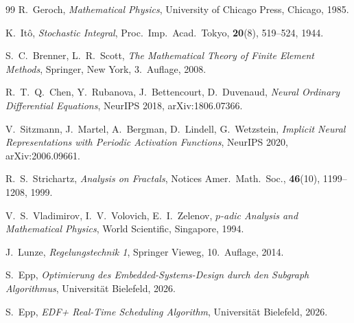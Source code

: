﻿\documentclass[a4paper,12pt]{article}
\theoremstyle{definition}
\begin{document}
\begin{thebibliography}{99}
R.~Geroch,
\textit{Mathematical Physics},
University of Chicago Press, Chicago, 1985.

K.~It\^o,
\textit{Stochastic Integral},
Proc.\ Imp.\ Acad.\ Tokyo, \textbf{20}(8), 519--524, 1944.

S.~C.\ Brenner, L.~R.\ Scott,
\textit{The Mathematical Theory of Finite Element Methods},
Springer, New York, 3.\ Auflage, 2008.

R.~T.~Q.\ Chen, Y.~Rubanova, J.~Bettencourt, D.~Duvenaud,
\textit{Neural Ordinary Differential Equations},
NeurIPS 2018, arXiv:1806.07366.

V.~Sitzmann, J.~Martel, A.~Bergman, D.~Lindell, G.~Wetzstein,
\textit{Implicit Neural Representations with Periodic Activation Functions},
NeurIPS 2020, arXiv:2006.09661.

R.~S.\ Strichartz,
\textit{Analysis on Fractals},
Notices Amer.\ Math.\ Soc., \textbf{46}(10), 1199--1208, 1999.

V.~S.\ Vladimirov, I.~V.\ Volovich, E.~I.\ Zelenov,
\textit{$p$-adic Analysis and Mathematical Physics},
World Scientific, Singapore, 1994.

J.~Lunze,
\textit{Regelungstechnik 1},
Springer Vieweg, 10.\ Auflage, 2014.

S.~Epp,
\textit{Optimierung des Embedded-Systems-Design durch den Subgraph Algorithmus},
Universit\"at Bielefeld, 2026.

S.~Epp,
\textit{EDF+ Real-Time Scheduling Algorithm},
Universit\"at Bielefeld, 2026.

\end{thebibliography}
\end{document}
